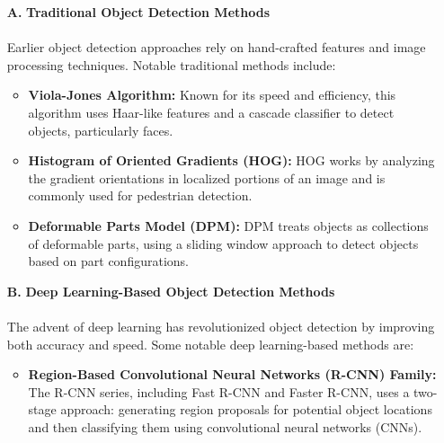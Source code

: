 \begin{itemize}
  \item[\textbf{A.}] \textbf{Traditional Object Detection Methods}\\\\ 
  Earlier object detection approaches rely on hand-crafted features and image processing techniques. Notable traditional methods include:
  \begin{itemize}
    \item \textbf{Viola-Jones Algorithm:} Known for its speed and efficiency, this algorithm uses Haar-like features and a cascade classifier to detect objects, particularly faces.
    \item \textbf{Histogram of Oriented Gradients (HOG):} HOG works by analyzing the gradient orientations in localized portions of an image and is commonly used for pedestrian detection.
    \item \textbf{Deformable Parts Model (DPM):} DPM treats objects as collections of deformable parts, using a sliding window approach to detect objects based on part configurations.\\
  \end{itemize}
  \item[\textbf{B.}] \textbf{Deep Learning-Based Object Detection Methods}\\\\
  The advent of deep learning has revolutionized object detection by improving both accuracy and speed. Some notable deep learning-based methods are:
  \begin{itemize}
    \item \textbf{Region-Based Convolutional Neural Networks (R-CNN) Family:} The  R-CNN series, including Fast R-CNN and Faster R-CNN, uses a two-stage approach: generating region proposals for potential object locations and then classifying them using convolutional neural networks (CNNs).

\end{itemize}
\end{itemize}
